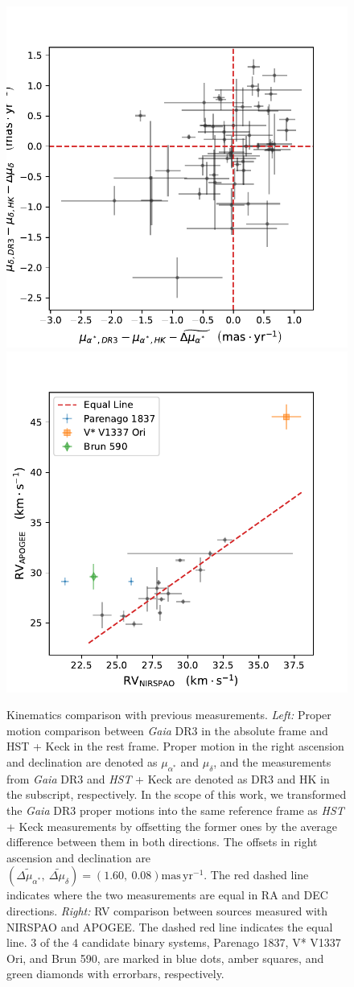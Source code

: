 \documentclass[12pt]{ucsddissertation}
\begin{document}
\begin{CJK*}{UTF8}{gbsn}
\begin{figure}[htb!]
    \centering
    \includegraphics[width=0.496\linewidth]{figures/chapter1/Proper_Motion_Comparison.pdf}
    \includegraphics[width=0.496\linewidth]{figures/chapter1/RV_Comparison.pdf}
    \caption[ONC kinematics comparison with previous measurements]{Kinematics comparison with previous measurements. \textit{Left:} Proper motion comparison between \textit{Gaia} DR3 in the absolute frame and HST + Keck in the rest frame. Proper motion in the right ascension and declination are denoted as $\mu_{\alpha^*}$ and $\mu_\delta$, and the measurements from \textit{Gaia} DR3 and \textit{HST} + Keck are denoted as DR3 and HK in the subscript, respectively. In the scope of this work, we transformed the \textit{Gaia} DR3 proper motions into the same reference frame as \textit{HST} + Keck measurements by offsetting the former ones by the average difference between them in both directions. The offsets in right ascension and declination are $\left(\widetilde{\Delta\mu_{\alpha^*}},~\widetilde{\Delta\mu_{\delta}}\right) = \left(1.60,~0.08\right) \mathrm{mas}\,\mathrm{yr}^{-1}$. The red dashed line indicates where the two measurements are equal in RA and DEC directions. \textit{Right:} RV comparison between sources measured with NIRSPAO and APOGEE. The dashed red line indicates the equal line. $3$ of the $4$ candidate binary systems, Parenago 1837, V* V1337 Ori, and Brun 590, are marked in blue dots, amber squares, and green diamonds with errorbars, respectively.}
    \label{fig:kinematics comparison}
\end{figure}


\end{CJK*}
\end{document}

